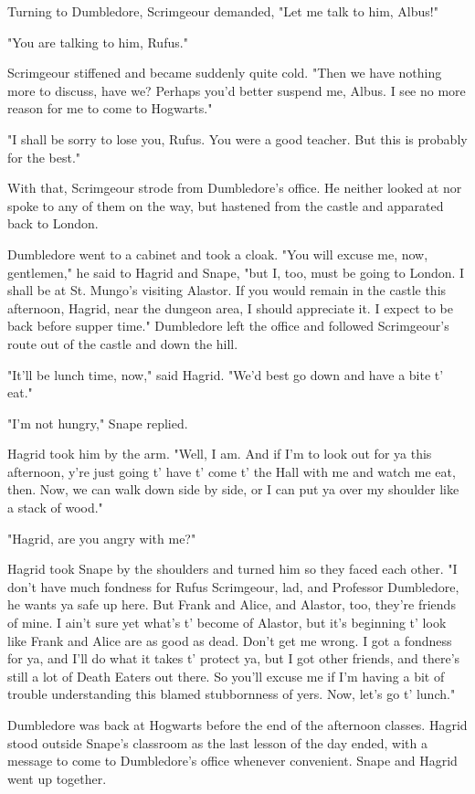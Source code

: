Turning to Dumbledore, Scrimgeour demanded, "Let me talk to him, Albus!"

"You are talking to him, Rufus."

Scrimgeour stiffened and became suddenly quite cold. "Then we have nothing more to discuss, have we? Perhaps you'd better suspend me, Albus. I see no more reason for me to come to Hogwarts."

"I shall be sorry to lose you, Rufus. You were a good teacher. But this is probably for the best."

With that, Scrimgeour strode from Dumbledore's office. He neither looked at nor spoke to any of them on the way, but hastened from the castle and apparated back to London.

Dumbledore went to a cabinet and took a cloak. "You will excuse me, now, gentlemen," he said to Hagrid and Snape, "but I, too, must be going to London. I shall be at St. Mungo's visiting Alastor. If you would remain in the castle this afternoon, Hagrid, near the dungeon area, I should appreciate it. I expect to be back before supper time." Dumbledore left the office and followed Scrimgeour's route out of the castle and down the hill.

"It'll be lunch time, now," said Hagrid. "We'd best go down and have a bite t' eat."

"I'm not hungry," Snape replied.

Hagrid took him by the arm. "Well, I am. And if I'm to look out for ya this afternoon, y're just going t' have t' come t' the Hall with me and watch me eat, then. Now, we can walk down side by side, or I can put ya over my shoulder like a stack of wood."

"Hagrid, are you angry with me?"

Hagrid took Snape by the shoulders and turned him so they faced each other. "I don't have much fondness for Rufus Scrimgeour, lad, and Professor Dumbledore, he wants ya safe up here. But Frank and Alice, and Alastor, too, they're friends of mine. I ain't sure yet what's t' become of Alastor, but it's beginning t' look like Frank and Alice are as good as dead. Don't get me wrong. I got a fondness for ya, and I'll do what it takes t' protect ya, but I got other friends, and there's still a lot of Death Eaters out there. So you'll excuse me if I'm having a bit of trouble understanding this blamed stubbornness of yers. Now, let's go t' lunch."

Dumbledore was back at Hogwarts before the end of the afternoon classes. Hagrid stood outside Snape's classroom as the last lesson of the day ended, with a message to come to Dumbledore's office whenever convenient. Snape and Hagrid went up together.

